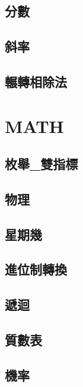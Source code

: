     \subsection{分數}
            
    \subsection{斜率}
            
    \subsection{輾轉相除法}
            

\section{MATH}
    \subsection{枚舉_雙指標}
            
    \subsection{物理}
            
    \subsection{星期幾}
            
    \subsection{進位制轉換}
            
    \subsection{遞迴}
            
    \subsection{質數表}
            
    \subsection{機率}
            

